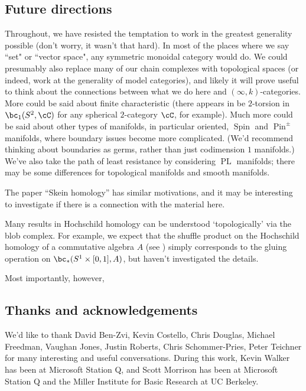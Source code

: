 \subsection{Future directions}
\label{sec:future}
Throughout, we have resisted the temptation to work in the greatest generality possible (don't worry, it wasn't that hard). 
In most of the places where we say ``set" or ``vector space", any symmetric monoidal category would do. We could presumably also replace many of our chain complexes with topological spaces (or indeed, work at the generality of model categories), and likely it will prove useful to think about the connections between what we do here and $(\infty,k)$-categories.
More could be said about finite characteristic (there appears in be $2$-torsion in $\bc_1(S^2, \cC)$ for any spherical $2$-category $\cC$, for example). Much more could be said about other types of manifolds, in particular oriented, $\operatorname{Spin}$ and $\operatorname{Pin}^{\pm}$ manifolds, where boundary issues become more complicated. (We'd recommend thinking about boundaries as germs, rather than just codimension $1$ manifolds.) We've also take the path of least resistance by considering $\operatorname{PL}$ manifolds; there may be some differences for topological manifolds and smooth manifolds.

The paper ``Skein homology'' \cite{MR1624157} has similar motivations, and it may be interesting to investigate if there is a connection with the material here.

Many results in Hochschild homology can be understood `topologically' via the blob complex. For example, we expect that the shuffle product on the Hochschild homology of a commutative algebra $A$ (see \cite[\S 4.2]{MR1600246}) simply corresponds to the gluing operation on $\bc_*(S^1 \times [0,1], A)$, but haven't investigated the details.

Most importantly, however,  


\subsection{Thanks and acknowledgements}
We'd like to thank David Ben-Zvi, Kevin Costello, Chris Douglas,
Michael Freedman, Vaughan Jones, Justin Roberts, Chris Schommer-Pries, Peter Teichner  for many interesting and useful conversations. 
During this work, Kevin Walker has been at Microsoft Station Q, and Scott Morrison has been at Microsoft Station Q and the Miller Institute for Basic Research at UC Berkeley.


